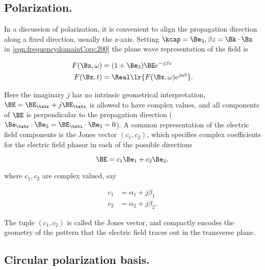 %
%
\subsection{Polarization.}
In a discussion of polarization, it is convenient to align the propagation direction along a fixed direction, usually the z-axis.
Setting \( \kcap = \Be_3, \beta z = \Bk \cdot \Bx \) in \cref{eqn:frequencydomainCore:200} the plane wave representation of the field is

\begin{dmath}\label{eqn:polarization:20}
\begin{aligned}
F(\Bx, \omega) &= (1 + \Be_3) \BE e^{-j \beta z} \\
F(\Bx, t) &= \Real\lr{ F(\Bx, \omega) e^{j \omega t} }.
\end{aligned}
\end{dmath}

Here the imaginary \( j \) has no intrinsic geometrical interpretation, \( \BE = \BE_\txtr + j \BE_\txti \) is allowed to have complex values, and all components of \( \BE \) is perpendicular to the propagation direction (\( \Be_\txtr \cdot \Be_3 = \BE_\txti \cdot \Be_3 = 0 \)).
A common representation of the electric field components is the Jones vector \( (c_1, c_2) \), which specifies complex coefficients for the electric field phasor in each of the possible directions

\begin{dmath}\label{eqn:polarization:120}
\BE = c_1 \Be_1 + c_2 \Be_2,
\end{dmath}

where \( c_1, c_2 \) are complex valued, say

\begin{dmath}\label{eqn:polarization:140}
\begin{aligned}
c_1 &= \alpha_1 + j \beta_1 \\
c_2 &= \alpha_2 + j \beta_2.
\end{aligned}
\end{dmath}

The tuple \( (c_1, c_2) \) is called the Jones vector, and compactly encodes the geometry of the pattern that the electric field traces out in the transverse plane.

\subsection{Circular polarization basis.}

